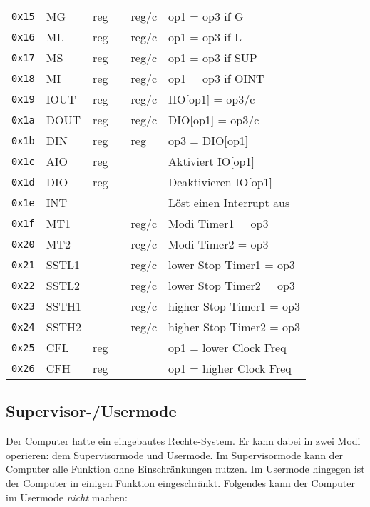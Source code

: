 \documentclass{scrartcl}
\begin{document}
\begin{center}
\begin{table*}
\begin{tabular}{l | l l l l | l}
			\texttt{0x15} & MG   & reg &  & reg/c & op1 = op3 if G \\
			\texttt{0x16} & ML   & reg &  & reg/c & op1 = op3 if L \\
			\texttt{0x17} & MS & reg &  & reg/c & op1 = op3 if SUP \\
			\texttt{0x18} & MI & reg &  & reg/c & op1 = op3 if OINT \\
			\hline
			\texttt{0x19} & IOUT & reg &  & reg/c & IIO[op1] = op3/c \\
			\texttt{0x1a} & DOUT & reg &  & reg/c & DIO[op1] = op3/c \\
			\texttt{0x1b} & DIN  & reg &  & reg & op3 = DIO[op1] \\
			\texttt{0x1c} & AIO  & reg &  &  & Aktiviert IO[op1] \\
			\texttt{0x1d} & DIO  & reg &  &  & Deaktivieren IO[op1] \\
			\hline
			\texttt{0x1e} & INT  & & & & Löst einen Interrupt aus \\
			\texttt{0x1f} & MT1  & & & reg/c & Modi Timer1 = op3 \\
			\texttt{0x20} & MT2  & & & reg/c & Modi Timer2 = op3 \\
			\texttt{0x21} & SSTL1 & & & reg/c & lower Stop Timer1 = op3 \\
			\texttt{0x22} & SSTL2 & & & reg/c & lower Stop Timer2 = op3 \\
			\texttt{0x23} & SSTH1 & & & reg/c & higher Stop Timer1 = op3 \\			
			\texttt{0x24} & SSTH2 & & & reg/c & higher Stop Timer2 = op3 \\
			\texttt{0x25} & CFL  & reg & & & op1 = lower Clock Freq \\
			\texttt{0x26} & CFH  & reg & & & op1 = higher Clock Freq \\
			
			\hline
		\end{tabular}
	\end{table*}
\end{center}


\subsection{\label{section:supervisor}Supervisor-/Usermode}

Der Computer hatte ein eingebautes Rechte-System. Er kann dabei in zwei Modi operieren: dem Supervisormode und Usermode. Im Supervisormode kann der Computer alle Funktion ohne Einschränkungen nutzen. Im Usermode hingegen ist der Computer in einigen Funktion eingeschränkt. Folgendes kann der Computer im Usermode \emph{nicht} machen:
\end{document}
